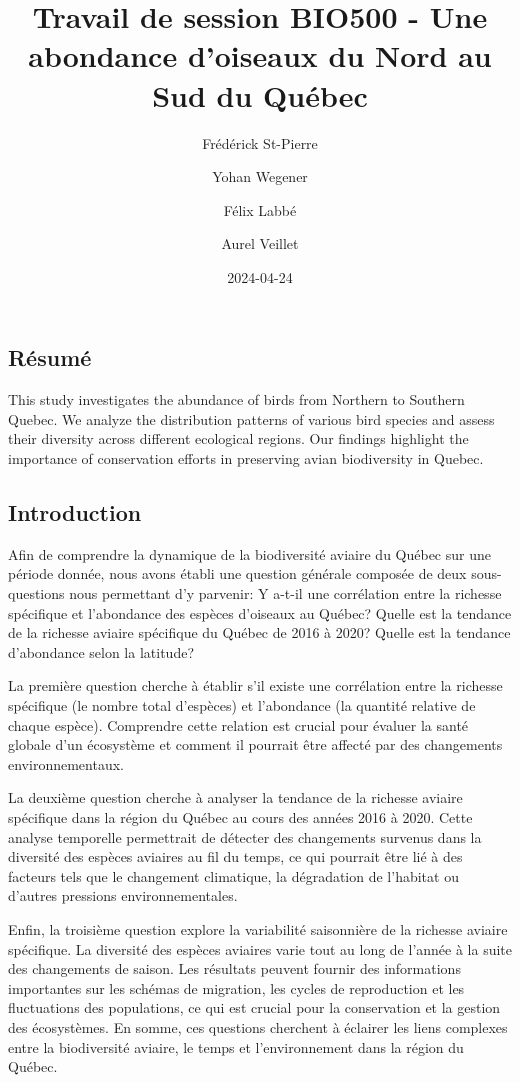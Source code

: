 \documentclass[
]{article}
\title{Travail de session BIO500 - Une abondance d'oiseaux du Nord au
Sud du Québec}
\author{Frédérick St-Pierre \and Yohan Wegener \and Félix
Labbé \and Aurel Veillet}
\date{2024-04-24}
\begin{document}
\maketitle

\hypertarget{ruxe9sumuxe9}{%
\subsection{Résumé}\label{ruxe9sumuxe9}}

This study investigates the abundance of birds from Northern to Southern
Quebec. We analyze the distribution patterns of various bird species and
assess their diversity across different ecological regions. Our findings
highlight the importance of conservation efforts in preserving avian
biodiversity in Quebec.

\hypertarget{introduction}{%
\subsection{Introduction}\label{introduction}}

Afin de comprendre la dynamique de la biodiversité aviaire du Québec sur
une période donnée, nous avons établi une question générale composée de
deux sous-questions nous permettant d'y parvenir: Y a-t-il une
corrélation entre la richesse spécifique et l'abondance des espèces
d'oiseaux au Québec? Quelle est la tendance de la richesse aviaire
spécifique du Québec de 2016 à 2020? Quelle est la tendance d'abondance
selon la latitude?

La première question cherche à établir s'il existe une corrélation entre
la richesse spécifique (le nombre total d'espèces) et l'abondance (la
quantité relative de chaque espèce). Comprendre cette relation est
crucial pour évaluer la santé globale d'un écosystème et comment il
pourrait être affecté par des changements environnementaux.

La deuxième question cherche à analyser la tendance de la richesse
aviaire spécifique dans la région du Québec au cours des années 2016 à
2020. Cette analyse temporelle permettrait de détecter des changements
survenus dans la diversité des espèces aviaires au fil du temps, ce qui
pourrait être lié à des facteurs tels que le changement climatique, la
dégradation de l'habitat ou d'autres pressions environnementales.

Enfin, la troisième question explore la variabilité saisonnière de la
richesse aviaire spécifique. La diversité des espèces aviaires varie
tout au long de l'année à la suite des changements de saison. Les
résultats peuvent fournir des informations importantes sur les schémas
de migration, les cycles de reproduction et les fluctuations des
populations, ce qui est crucial pour la conservation et la gestion des
écosystèmes. En somme, ces questions cherchent à éclairer les liens
complexes entre la biodiversité aviaire, le temps et l'environnement
dans la région du Québec.
\end{document}
